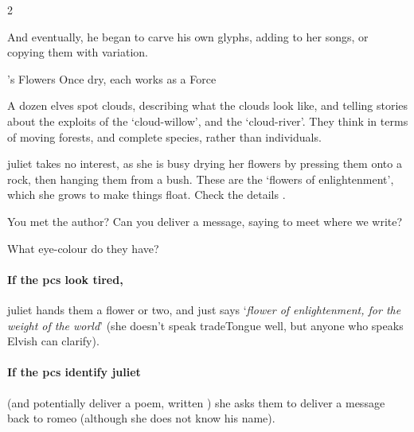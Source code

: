 \begin{multicols}{2}
\begin{exampletext}
  And eventually, he began to carve his own glyphs, adding to her songs, or copying them with variation.
\end{exampletext}



{'s Flowers}%
{Once dry, each works as a Force }%

A dozen elves spot clouds, describing what the clouds look like, and telling stories about the exploits of the `cloud-willow', and the `cloud-river'.
They think in terms of moving forests, and complete species, rather than individuals.

\Gls{juliet} takes no interest, as she is busy drying her flowers by pressing them onto a rock, then hanging them from a bush.
These are the `flowers of enlightenment', which she grows to make things float.
Check the details .

\juliet

\showStdSpells

\begin{speechtext}
  You met the author?
  Can you deliver a message, saying to meet where we write?

  What eye-colour do they have?
\end{speechtext}

\paragraph{If the \glspl{pc} look tired,}
\gls{juliet} hands them a flower or two, and just says `\textit{flower of enlightenment, for the weight of the world}' (she doesn't speak \gls{tradeTongue} well, but anyone who speaks Elvish can clarify).

\paragraph{If the \glspl{pc} identify \gls{juliet}}
(and potentially deliver a poem, written ) she asks them to deliver a message back to \gls{romeo} (although she does not know his name).


\end{multicols}
